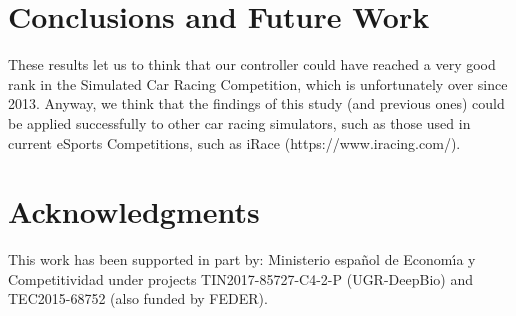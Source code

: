 \documentclass[conference]{IEEEtran}
\begin{document}
\section{Conclusions and Future Work} 
\label{sec:conclusions}



These results let us to think that our controller could have reached a very good rank in the Simulated Car Racing Competition, which is unfortunately over since 2013. Anyway, we think that the findings of this study (and previous ones) could be applied successfully to other car racing simulators, such as those used in current eSports Competitions, such as iRace (https://www.iracing.com/).



\section*{Acknowledgments}

This work has been supported in part by: Ministerio espa\~{n}ol de
Econom\'{\i}a y Competitividad under projects  TIN2017-85727-C4-2-P (UGR-DeepBio) and TEC2015-68752 (also funded by FEDER).



\end{document}
